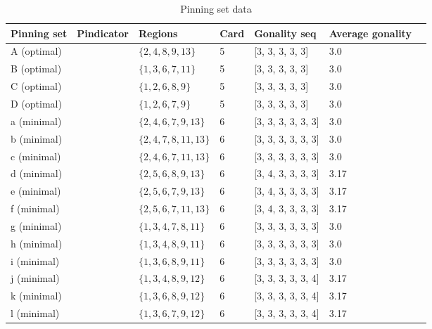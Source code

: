 \documentclass{article}%
\begin{document}
\begin{table}[ht]
	\caption{Pinning set data}
	\centering
	\renewcommand{\arraystretch}{1.5}
	\begin{tabularx}{\textwidth}{lXXXXXX}
		\toprule
			Pinning set & Pindicator & Regions & Card & Gonality seq & Average gonality\\
			\hline
			A (optimal) & {\Huge\textcolor{red0}{\textbullet}} & $\{2,4,8,9,13\}$ & 5 & [3, 3, 3, 3, 3] & 3.0 \\
			B (optimal) & {\Huge\textcolor{red1}{\textbullet}} & $\{1,3,6,7,11\}$ & 5 & [3, 3, 3, 3, 3] & 3.0 \\
			C (optimal) & {\Huge\textcolor{red2}{\textbullet}} & $\{1,2,6,8,9\}$ & 5 & [3, 3, 3, 3, 3] & 3.0 \\
			D (optimal) & {\Huge\textcolor{red3}{\textbullet}} & $\{1,2,6,7,9\}$ & 5 & [3, 3, 3, 3, 3] & 3.0 \\
			a (minimal) & {\Huge\textcolor{green0}{\textbullet}} & $\{2,4,6,7,9,13\}$ & 6 & [3, 3, 3, 3, 3, 3] & 3.0 \\
			b (minimal) & {\Huge\textcolor{green1}{\textbullet}} & $\{2,4,7,8,11,13\}$ & 6 & [3, 3, 3, 3, 3, 3] & 3.0 \\
			c (minimal) & {\Huge\textcolor{green2}{\textbullet}} & $\{2,4,6,7,11,13\}$ & 6 & [3, 3, 3, 3, 3, 3] & 3.0 \\
			d (minimal) & {\Huge\textcolor{green3}{\textbullet}} & $\{2,5,6,8,9,13\}$ & 6 & [3, 4, 3, 3, 3, 3] & 3.17 \\
			e (minimal) & {\Huge\textcolor{green4}{\textbullet}} & $\{2,5,6,7,9,13\}$ & 6 & [3, 4, 3, 3, 3, 3] & 3.17 \\
			f (minimal) & {\Huge\textcolor{green5}{\textbullet}} & $\{2,5,6,7,11,13\}$ & 6 & [3, 4, 3, 3, 3, 3] & 3.17 \\
			g (minimal) & {\Huge\textcolor{green6}{\textbullet}} & $\{1,3,4,7,8,11\}$ & 6 & [3, 3, 3, 3, 3, 3] & 3.0 \\
			h (minimal) & {\Huge\textcolor{green7}{\textbullet}} & $\{1,3,4,8,9,11\}$ & 6 & [3, 3, 3, 3, 3, 3] & 3.0 \\
			i (minimal) & {\Huge\textcolor{green8}{\textbullet}} & $\{1,3,6,8,9,11\}$ & 6 & [3, 3, 3, 3, 3, 3] & 3.0 \\
			j (minimal) & {\Huge\textcolor{green9}{\textbullet}} & $\{1,3,4,8,9,12\}$ & 6 & [3, 3, 3, 3, 3, 4] & 3.17 \\
			k (minimal) & {\Huge\textcolor{green10}{\textbullet}} & $\{1,3,6,8,9,12\}$ & 6 & [3, 3, 3, 3, 3, 4] & 3.17 \\
			l (minimal) & {\Huge\textcolor{green11}{\textbullet}} & $\{1,3,6,7,9,12\}$ & 6 & [3, 3, 3, 3, 3, 4] & 3.17 \\

\end{tabularx}
\end{table}
\end{document}
